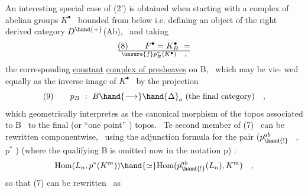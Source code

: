 An interesting special case of (2') is obtained when starting with
a complex of abelian groups $K^\bullet$ \ bounded from below i.e. defining an object
of the right derived category $D^{\hand{+}}$(Ab), \ and taking
\[ (8) \qquad F^\bullet = K_B^\bullet \ = \over{\unsure{f}}{p}{}_B^*(K^\bullet) \quad , \]
the corresponding \uline{constant} \uline{complex of presheaves} on B, \ which may be vie-%
wed equally as the inverse image of $K^\bullet$ \ by the projection
\[ (9) \qquad p_B \ : \ B \hand{\longrightarrow} \hand{\Delta}_o \ \text{(the final category)} \quad , \]
which geometrically interpretes as the canonical morphism of the topos
associated to  B \ to the final (or ``one point'' ) topos. \ Te second
member of (7) \ can be rewritten componentwise, \ using the adjunction
formula for the pair ($p_{\hand{!}}^{ab}$ \ , $p^*$ ) (where the qualifying B is omitted now in
the notation p) :
\[ \mathrm{Hom}(L_n,p^*(K^m)) \hand{\simeq} \mathrm{Hom}(p_{\hand{!}}^{ab}(L_n),K^m) \quad , \]
so that (7) can be rewritten \ as


